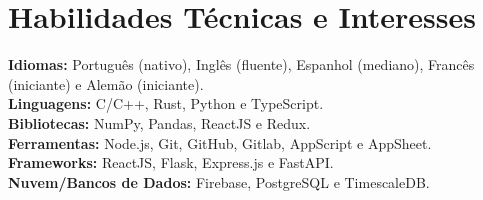     \vspace{-3.0mm}
  \resumeSubHeadingListEnd
  

\section{\textbf{Habilidades Técnicas e Interesses}}
\begin{itemize}[leftmargin=0.05in, label={}]
    \small{\item{
     \textbf{Idiomas:}{ Português (nativo), Inglês (fluente), Espanhol (mediano), Francês (iniciante) e Alemão (iniciante).} \\
     \textbf{Linguagens:}{ C/C++, Rust, Python e TypeScript. } \\
     \textbf{Bibliotecas:}{ NumPy, Pandas, ReactJS e Redux. }\\ 
     \textbf{Ferramentas:}{ Node.js, Git, GitHub,  Gitlab, AppScript e AppSheet. } \\ 
     \textbf{Frameworks:}{ ReactJS, Flask, Express.js e FastAPI. } \\
     \textbf{Nuvem/Bancos de Dados:}{ Firebase, PostgreSQL e TimescaleDB. } \\  
    }}
\end{itemize}


